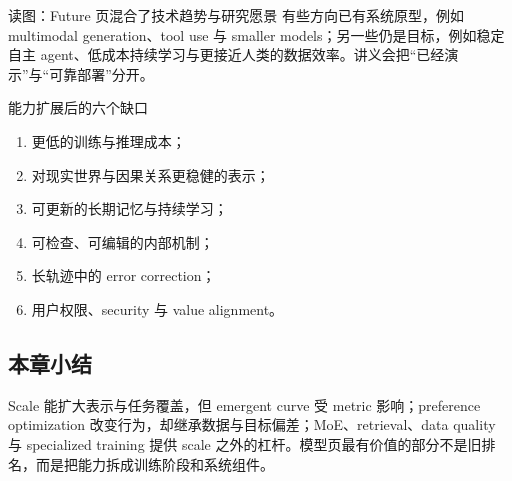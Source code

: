 

\begin{knowledgebox}{读图：Future 页混合了技术趋势与研究愿景}
有些方向已有系统原型，例如 multimodal generation、tool use 与 smaller models；另一些仍是目标，例如稳定自主 agent、低成本持续学习与更接近人类的数据效率。讲义会把“已经演示”与“可靠部署”分开。
\end{knowledgebox}


\begin{importantbox}{能力扩展后的六个缺口}
\begin{enumerate}
  \item 更低的训练与推理成本；
  \item 对现实世界与因果关系更稳健的表示；
  \item 可更新的长期记忆与持续学习；
  \item 可检查、可编辑的内部机制；
  \item 长轨迹中的 error correction；
  \item 用户权限、security 与 value alignment。
\end{enumerate}
\end{importantbox}

\subsection{本章小结}

Scale 能扩大表示与任务覆盖，但 emergent curve 受 metric 影响；preference optimization 改变行为，却继承数据与目标偏差；MoE、retrieval、data quality 与 specialized training 提供 scale 之外的杠杆。模型页最有价值的部分不是旧排名，而是把能力拆成训练阶段和系统组件。

